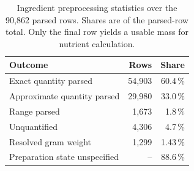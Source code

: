 \begin{table}[t]
\caption{Ingredient preprocessing statistics over the 90{,}862 parsed rows.
Shares are of the parsed-row total. Only the final row yields a usable mass for
nutrient calculation.}
\label{tab:preprocessing}
\centering
\footnotesize
\setlength{\tabcolsep}{4pt}
\begin{tabular}{@{}lrr@{}}
\toprule
\textbf{Outcome} & \textbf{Rows} & \textbf{Share} \\
\midrule
Exact quantity parsed           & 54{,}903 & 60.4\,\% \\
Approximate quantity parsed     & 29{,}980 & 33.0\,\% \\
Range parsed                    & 1{,}673  & 1.8\,\%  \\
Unquantified                    & 4{,}306  & 4.7\,\%  \\
\midrule
Resolved gram weight            & 1{,}299  & 1.43\,\% \\
Preparation state unspecified   & --       & 88.6\,\% \\
\bottomrule
\end{tabular}
\end{table}
